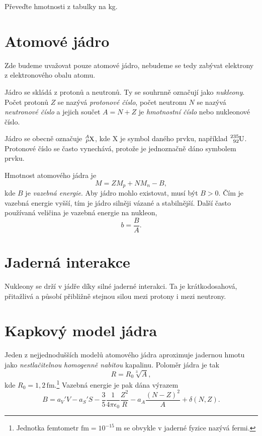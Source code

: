 \documentclass[a4paper,12pt,oneside]{article}
\def\unit#1{\,\mathrm{#1}}
\def\c{,\!}                             %
\theoremstyle{red}
\begin{document}
\begin{task}
    Převeďte hmotnosti z tabulky na kg.
\end{task}

\section{Atomové jádro}
    Zde budeme uvažovat pouze atomové jádro, nebudeme se tedy zabývat elektrony z elektronového obalu atomu.

    Jádro se skládá z protonů a neutronů. Ty se souhrnně označují jako \emph{nukleony}.
    Počet protonů $Z$ se nazývá \emph{protonové číslo},
    počet neutronu $N$ se nazývá \emph{neutronové číslo}
    a jejich součet $A=N+Z$ je \emph{hmotnostní číslo} nebo nukleonové číslo.

    Jádro se obecně označuje $\ce{^{\it A}_{\it P}X}$, kde X je symbol daného prvku, například $\ce{^{235}_{92}U}$.
    Protonové číslo se často vynechává, protože je jednoznačně dáno symbolem prvku.

    Hmotnost atomového jádra je
    \begin{equation}
        M=ZM_{p}+NM_{n}-B,
    \end{equation}
    kde $B$ je \emph{vazebná energie}.
    Aby jádro mohlo existovat, musí být $B>0$.
    Čím je vazebná energie vyšší, tím je jádro silněji vázané a stabilnější.
    Další často používaná veličina je vazebná energie na nukleon,
    \begin{equation}
        b=\frac{B}{A}.
    \end{equation}

\section{Jaderná interakce}
    Nukleony se drží v jádře díky silné jaderné interakci. 
    Ta je krátkodosahová, přitažlivá a působí přibližně stejnou silou mezi protony i mezi neutrony.

\section{Kapkový model jádra}
    Jeden z nejjednodušších modelů atomového jádra aproximuje jadernou hmotu jako \emph{nestlačitelnou} \emph{homogenně nabitou} kapalinu.
    Poloměr jádra je tak
    \begin{equation}
        R=R_{0}\sqrt[3]{A},
    \end{equation}
    kde $R_{0}=1\c2\unit{fm}$.\footnote{Jednotka femtometr $\mathrm{fm}=10^{-15}\unit{m}$ se obvykle v jaderné fyzice nazývá fermi.}
    Vazebná energie je pak dána výrazem
    \begin{equation}
        \label{eq:BetheWeizsackerVS}
        B=a_{V}'V-a_{S}'S-\frac{3}{5}\frac{1}{4\pi\epsilon_{0}}\frac{Z^{2}}{R}-a_{A}\frac{\left(N-Z\right)^{2}}{A}+\delta(N,Z).
    \end{equation}
\end{document}
